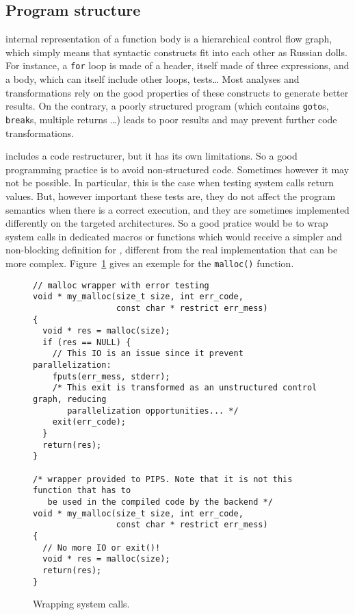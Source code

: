 \documentclass[a4paper]{article}
\begin{document}
\subsection{Program structure}
\label{sec:program-structure}

\Apips internal representation of a function body is a hierarchical
control flow graph, which simply means that syntactic constructs fit
into each other as Russian dolls. For instance, a \texttt{for} loop is
made of a header, itself made of three expressions, and a body, which
can itself include other loops, tests\ldots{} Most analyses and
transformations rely on the good properties of these constructs to
generate better results. On the contrary, a poorly structured program
(which contains \texttt{goto}s, \texttt{break}s, multiple {return}s
\ldots) leads to poor results and may prevent further code
transformations.

\Apips includes a code restructurer, but it has its own limitations. So a
good programming practice is to avoid non-structured code. Sometimes
however it may not be possible. In particular, this is the case when
testing system calls return values. But, however important these tests
are, they do not affect the program semantics when there is a correct
execution, and they are sometimes implemented differently on the targeted
architectures. So a good pratice would be to wrap system calls in
dedicated macros or functions which would receive a simpler and
non-blocking definition for \Apips, different from the real implementation
that can be more complex. Figure~\ref{fig:wrapping_system_calls} gives an
exemple for the \texttt{malloc()} function.

\begin{figure}
\begin{lstlisting}
// malloc wrapper with error testing
void * my_malloc(size_t size, int err_code,
                 const char * restrict err_mess)
{
  void * res = malloc(size);
  if (res == NULL) {
    // This IO is an issue since it prevent parallelization:
    fputs(err_mess, stderr);
    /* This exit is transformed as an unstructured control graph, reducing
       parallelization opportunities... */
    exit(err_code);
  }
  return(res);
}

/* wrapper provided to PIPS. Note that it is not this function that has to
   be used in the compiled code by the backend */
void * my_malloc(size_t size, int err_code,
                 const char * restrict err_mess)
{
  // No more IO or exit()!
  void * res = malloc(size);
  return(res);
}
\end{lstlisting}

  \caption{Wrapping system calls.}
  \label{fig:wrapping_system_calls}
\end{figure}
\end{document}
